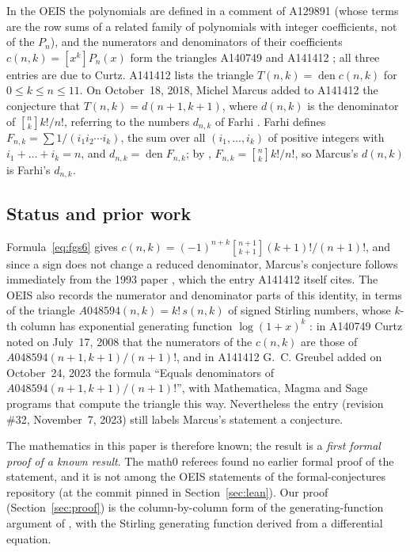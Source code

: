 \documentclass[11pt]{amsart}
\theoremstyle{plain}
\theoremstyle{definition}
\newcommand{\den}{\operatorname{den}}
\newcommand{\st}[2]{\genfrac{[}{]}{0pt}{}{#1}{#2}}
\begin{document}
In the OEIS the polynomials are defined in a comment of A129891 \cite{A129891} (whose terms are the row sums of a related family of polynomials with integer coefficients, not of the $P_n$), and the numerators and denominators of their coefficients $c(n,k)=[x^k]P_n(x)$ form the triangles A140749 \cite{A140749} and A141412 \cite{A141412}; all three entries are due to Curtz. A141412 lists the triangle $T(n,k)=\den c(n,k)$ for $0\le k\le n\le 11$.
On October~18, 2018, Michel Marcus added to A141412 the conjecture that $T(n,k)=d(n+1,k+1)$, where $d(n,k)$ is the denominator of $\st nk k!/n!$, referring to the numbers $d_{n,k}$ of Farhi \cite{Fa19}.
Farhi defines $F_{n,k}=\sum 1/(i_1i_2\cdots i_k)$, the sum over all $(i_1,\dots,i_k)$ of positive integers with $i_1+\dots+i_k=n$, and $d_{n,k}=\den F_{n,k}$; by \cite[Prop.~4.1]{Fa19}, $F_{n,k}=\st nk k!/n!$, so Marcus's $d(n,k)$ is Farhi's $d_{n,k}$.

\subsection*{Status and prior work}
Formula~\eqref{eq:fgs6} gives $c(n,k)=(-1)^{n+k}\st{n+1}{k+1}(k+1)!/(n+1)!$, and since a sign does not change a reduced denominator, Marcus's conjecture follows immediately from the 1993 paper \cite{FGS}, which the entry A141412 itself cites.
The OEIS also records the numerator and denominator parts of this identity, in terms of the triangle $A048594(n,k)=k!\,s(n,k)$ of signed Stirling numbers, whose $k$-th column has exponential generating function $\log(1+x)^k$ \cite{A048594}: in A140749 Curtz noted on July~17, 2008 that the numerators of the $c(n,k)$ are those of $A048594(n+1,k+1)/(n+1)!$, and in A141412 G.~C. Greubel added on October~24, 2023 the formula ``Equals denominators of $A048594(n+1,k+1)/(n+1)!$'', with Mathematica, Magma and Sage programs that compute the triangle this way.
Nevertheless the entry (revision \#32, November~7, 2023) still labels Marcus's statement a conjecture.

The mathematics in this paper is therefore known; the result is a \emph{first formal proof of a known result}.
The math0 referees found no earlier formal proof of the statement, and it is not among the OEIS statements of the formal-conjectures repository \cite{FC} (at the commit pinned in Section~\ref{sec:lean}).
Our proof (Section~\ref{sec:proof}) is the column-by-column form of the generating-function argument of \cite{FGS}, with the Stirling generating function derived from a differential equation.
\end{document}
